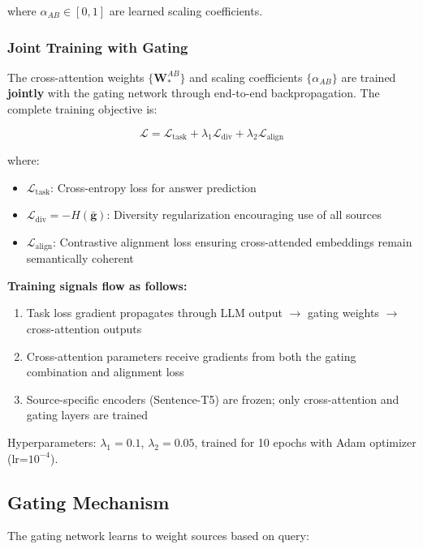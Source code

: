 \documentclass[10pt,twocolumn]{article}
\begin{document}
{where $\alpha_{AB} \in [0, 1]$ are learned scaling coefficients.

\subsubsection{Joint Training with Gating}

The cross-attention weights $\{\mathbf{W}_*^{AB}\}$ and scaling coefficients $\{\alpha_{AB}\}$ are trained \textbf{jointly} with the gating network through end-to-end backpropagation. The complete training objective is:

\begin{equation}
\mathcal{L} = \mathcal{L}_{\text{task}} + \lambda_1 \mathcal{L}_{\text{div}} + \lambda_2 \mathcal{L}_{\text{align}}
\end{equation}

where:
\begin{itemize}
    \item $\mathcal{L}_{\text{task}}$: Cross-entropy loss for answer prediction
    \item $\mathcal{L}_{\text{div}} = -H(\bar{\mathbf{g}})$: Diversity regularization encouraging use of all sources
    \item $\mathcal{L}_{\text{align}}$: Contrastive alignment loss ensuring cross-attended embeddings remain semantically coherent
\end{itemize}

\textbf{Training signals flow as follows:}
\begin{enumerate}
    \item Task loss gradient propagates through LLM output $\rightarrow$ gating weights $\rightarrow$ cross-attention outputs
    \item Cross-attention parameters receive gradients from both the gating combination and alignment loss
    \item Source-specific encoders (Sentence-T5) are frozen; only cross-attention and gating layers are trained
\end{enumerate}

Hyperparameters: $\lambda_1 = 0.1$, $\lambda_2 = 0.05$, trained for 10 epochs with Adam optimizer (lr=$10^{-4}$).
}

\subsection{Gating Mechanism}
\label{sec:gating}

The gating network learns to weight sources based on query:
\end{document}
